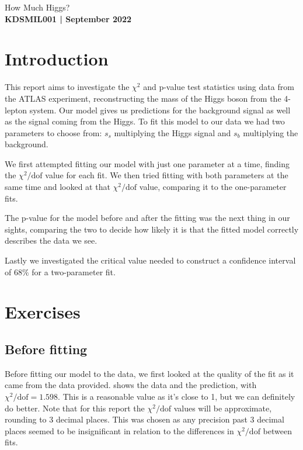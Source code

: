 \documentclass[11pt]{article}
\newcommand{\chisqdof}{\chi^2/\mathrm{dof}}
\numberwithin{equation}{section}
\numberwithin{figure}{section}
\numberwithin{table}{section}
\begin{document}
\begin{center}
    {\huge How Much Higgs?}\\
    \vspace{0.2in}
    \textbf{KDSMIL001 | September 2022}
    
    
\end{center}

\section{Introduction}\label{sec:Introduction}
This report aims to investigate the $\chi^2$ and p-value test statistics using data from the ATLAS experiment, reconstructing the mass of the Higgs boson from the 4-lepton system. Our model gives us predictions for the background signal as well as the signal coming from the Higgs. To fit this model to our data we had two parameters to choose from: $s_s$ multiplying the Higgs signal and $s_b$ multiplying the background. 

We first attempted fitting our model with just one parameter at a time, finding the $\chisqdof$ value for each fit. We then tried fitting with both parameters at the same time and looked at that $\chisqdof$ value, comparing it to the one-parameter fits. 

The p-value for the model before and after the fitting was the next thing in our sights, comparing the two to decide how likely it is that the fitted model correctly describes the data we see. 

Lastly we investigated the critical value needed to construct a confidence interval of $68\%$ for a two-parameter fit.

\section{Exercises}\label{sec:Exercises}
\subsection{Before fitting}
Before fitting our model to the data, we first looked at the quality of the fit as it came from the data provided.  shows the data and the prediction, with $\chisqdof=\num{1.598}$. This is a reasonable value as it's close to 1, but we can definitely do better. Note that for this report the $\chisqdof$ values will be approximate, rounding to 3 decimal places. This was chosen as any precision past 3 decimal places seemed to be insignificant in relation to the differences in $\chisqdof$ between fits.
\end{document}
